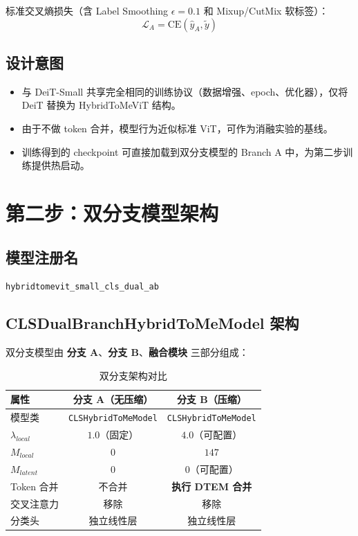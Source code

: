 \documentclass[a4paper,11pt]{article}
\begin{document}
标准交叉熵损失（含 Label Smoothing $\epsilon=0.1$ 和 Mixup/CutMix 软标签）：
\[
    \mathcal{L}_A = \text{CE}(\hat{y}_A, \tilde{y})
\]

\subsection{设计意图}

\begin{itemize}
    \item 与 DeiT-Small 共享完全相同的训练协议（数据增强、epoch、优化器），仅将 DeiT 替换为 HybridToMeViT 结构。
    \item 由于不做 token 合并，模型行为近似标准 ViT，可作为消融实验的基线。
    \item 训练得到的 checkpoint 可直接加载到双分支模型的 Branch A 中，为第二步训练提供热启动。
\end{itemize}

\section{第二步：双分支模型架构}

\subsection{模型注册名}

\texttt{hybridtomevit\_small\_cls\_dual\_ab}

\subsection{CLSDualBranchHybridToMeModel 架构}

双分支模型由 \textbf{分支 A}、\textbf{分支 B}、\textbf{融合模块} 三部分组成：

\begin{table}[h]
\centering
\caption{双分支架构对比}
\begin{tabular}{l c c}
\toprule
\textbf{属性} & \textbf{分支 A（无压缩）} & \textbf{分支 B（压缩）} \\
\midrule
模型类 & \texttt{CLSHybridToMeModel} & \texttt{CLSHybridToMeModel} \\
$\lambda_{local}$ & $1.0$（固定） & $4.0$（可配置） \\
$M_{local}$ & $0$ & $147$ \\
$M_{latent}$ & $0$ & $0$（可配置） \\
Token 合并 & 不合并 & \textbf{执行 DTEM 合并} \\
交叉注意力 & 移除 & 移除 \\
分类头 & 独立线性层 & 独立线性层 \\
\bottomrule
\end{tabular}
\end{table}
\end{document}
